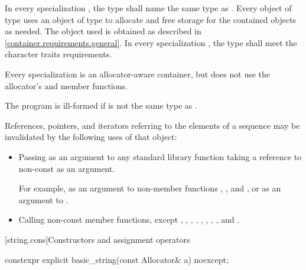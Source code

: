 \pnum
In every specialization ,
the type  shall name the same type
as . Every object of type
 uses an object of type
 to allocate and free storage for the contained 
objects as needed. The  object used is
obtained as described in \ref{container.requirements.general}.
In every specialization ,
the type  shall meet
the character traits requirements.
\begin{note}
Every specialization  is
an allocator-aware container,
but does not use the allocator's  and 
member functions.
\end{note}
\begin{note}
The program is ill-formed if 
is not the same type as .
\end{note}

\pnum
References, pointers, and iterators referring to the elements of a
 sequence may be
invalidated by the following uses of that  object:

\begin{itemize}
\item Passing as an argument to any standard library function taking a reference to non-const
 as an argument.
\begin{footnote}
For example, as an argument to non-member
functions ,
, and , or as
an argument to .
\end{footnote}

\item Calling non-const member functions, except
,
,
,
,
,
,
,
,
and
.
\end{itemize}

[string.cons]{Constructors and assignment operators}

%
\begin{itemdecl}
constexpr explicit basic_string(const Allocator& a) noexcept;
\end{itemdecl}

